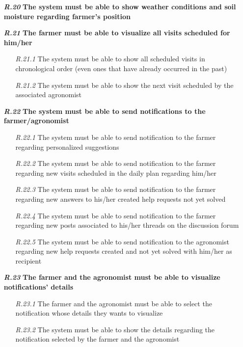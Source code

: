 \begin{itemize}
        \item [\textbf{\textit{R.20}}] \textbf{The system must be able to show weather conditions and soil moisture regarding farmer’s position}
        \item [\textbf{\textit{R.21}}] \textbf{The farmer must be able to visualize all visits scheduled for him/her}
        \begin{itemize}
            \item [\textit{R.21.1}] The system must be able to show all scheduled visits in chronological order (even ones that have already occurred in the past)
             \item [\textit{R.21.2}] The system must be able to show the next visit scheduled by the associated agronomist
        \end{itemize}
        \item [\textbf{\textit{R.22}}] \textbf{The system must be able to send notifications to the farmer/agronomist}
        \begin{itemize}
            \item [\textit{R.22.1}] The system must be able to send notification to the farmer regarding personalized suggestions
            \item [\textit{R.22.2}] The system must be able to send notification to the farmer regarding new visits scheduled in the daily plan regarding him/her
            \item [\textit{R.22.3}] The system must be able to send notification to the farmer regarding new answers to his/her created help requests not yet solved
            \item [\textit{R.22.4}] The system must be able to send notification to the farmer regarding new posts associated to his/her threads on the discussion forum
            \item [\textit{R.22.5}] The system must be able to send notification to the agronomist regarding new help requests created and not yet solved with him/her as recipient
        \end{itemize}
        \item [\textbf{\textit{R.23}}] \textbf{The farmer and the agronomist must be able to visualize notifications’ details}
        \begin{itemize}
            \item [\textit{R.23.1}] The farmer and the agronomist must be able to select the notification whose details they wants to visualize
            \item [\textit{R.23.2}] The system must be able to show the details regarding the notification selected by the farmer and the agronomist

\end{itemize}
\end{itemize}

